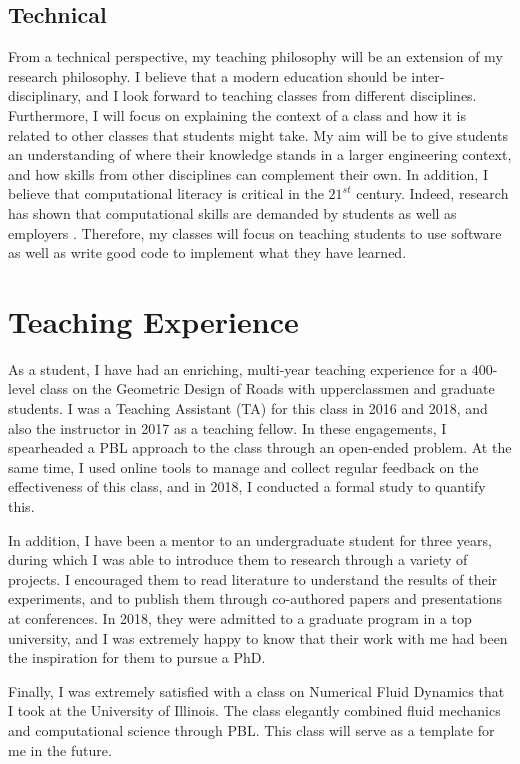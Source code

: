 \documentclass[12pt]{article}
\begin{document}
\subsection*{Technical}  
From a technical perspective, my teaching philosophy will be an extension of my research philosophy. I believe that a modern education should be inter-disciplinary, and I look forward to teaching classes from different disciplines. Furthermore, I will focus on explaining the context of a class and how it is related to other classes that students might take. My aim will be to give students an understanding of where their knowledge stands in a larger engineering context, and how skills from other disciplines can complement their own. In addition, I believe that computational literacy is critical in the $21^{st}$ century. Indeed, research has shown that computational skills are demanded by students as well as employers \cite{magana2012motivation}. Therefore, my classes will focus on teaching students to use software as well as write good code to implement what they have learned.

\section*{Teaching Experience}
As a student, I have had an enriching, multi-year teaching experience for a 400-level class on the Geometric Design of Roads with upperclassmen and graduate students. I was a Teaching Assistant (TA) for this class in 2016 and 2018, and also the instructor in 2017 as a teaching fellow. In these engagements, I spearheaded a PBL approach to the class through an open-ended problem. At the same time, I used online tools to manage and collect regular feedback on the effectiveness of this class, and in 2018, I conducted a formal study to quantify this.

In addition, I have been a mentor to an undergraduate student for three years, during which I was able to introduce them to research through a variety of projects. I encouraged them to read literature to understand the results of their experiments, and to publish them through co-authored papers and presentations at conferences. In 2018, they were admitted to a graduate program in a top university, and I was extremely happy to know that their work with me had been the inspiration for them to pursue a PhD.

Finally, I was extremely satisfied with a class on Numerical Fluid Dynamics that I took at the University of Illinois. The class elegantly combined fluid mechanics and computational science through PBL. This class will serve as a template for me in the future.
\end{document}
